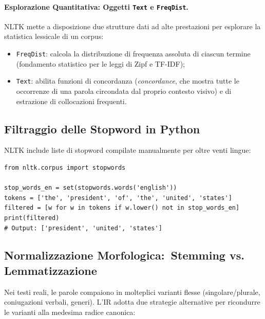 \paragraph{Esplorazione Quantitativa: Oggetti \texttt{Text} e \texttt{FreqDist}.}
NLTK mette a disposizione due strutture dati ad alte prestazioni per esplorare la statistica lessicale di un corpus:
\begin{itemize}
    \item \texttt{FreqDist}: calcola la distribuzione di frequenza assoluta di ciascun termine (fondamento statistico per le leggi di Zipf e TF-IDF);
    \item \texttt{Text}: abilita funzioni di concordanza (\textit{concordance}, che mostra tutte le occorrenze di una parola circondata dal proprio contesto visivo) e di estrazione di collocazioni frequenti.
\end{itemize}

\FloatBarrier
\subsection{Filtraggio delle Stopword in Python}
\label{subsec:stopword-nltk}

NLTK include liste di stopword compilate manualmente per oltre venti lingue:

\begin{lstlisting}[style=pythoncode,caption={Rimozione delle stopword con NLTK.}]
from nltk.corpus import stopwords

stop_words_en = set(stopwords.words('english'))
tokens = ['the', 'president', 'of', 'the', 'united', 'states']
filtered = [w for w in tokens if w.lower() not in stop_words_en]
print(filtered)
# Output: ['president', 'united', 'states']
\end{lstlisting}

\FloatBarrier
\subsection[Normalizzazione Morfologica]{Normalizzazione Morfologica:\ Stemming vs. Lemmatizzazione}
\label{subsec:stemming-lemmatizzazione}

Nei testi reali, le parole compaiono in molteplici varianti flesse (singolare/plurale, coniugazioni verbali, generi). L'IR adotta due strategie alternative per ricondurre le varianti alla medesima radice canonica:

